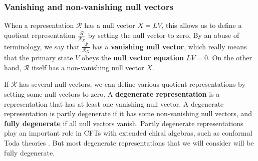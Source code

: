 \documentclass[12pt, a4paper]{article}
\theoremstyle{break}
\begin{document}
\subsubsection{Vanishing and non-vanishing null vectors}

When a representation $\mathcal{R}$ has a null vector $X{}=LV{}$, this allows us to define a quotient representation $\frac{\mathcal{R}}{\mathcal{R}_{X{}}}$ by setting the null vector to zero. 
By an abuse of terminology, we say that $\frac{\mathcal{R}}{\mathcal{R}_{X{}}}$ has a \textbf{vanishing null vector}, which really means that the primary state $V{}$ obeys the \textbf{null vector equation} $LV{}=0$. On the other hand, $\mathcal{R}$ itself has a non-vanishing null vector $X{}$. 

If $\mathcal{R}$ has several null vectors, we can define various quotient representations by setting some null vectors to zero. A \textbf{degenerate representation} is a representation that has at least one vanishing null vector. A degenerate representation is partly degenerate if it has some non-vanishing null vectors, and \textbf{fully degenerate} if all null vectors vanish. Partly degenerate representations play an important role in CFTs with extended chiral algebras, such as conformal Toda theories \cite{fl07c}. But most degenerate representations that we will consider will be fully degenerate. 
\end{document}
